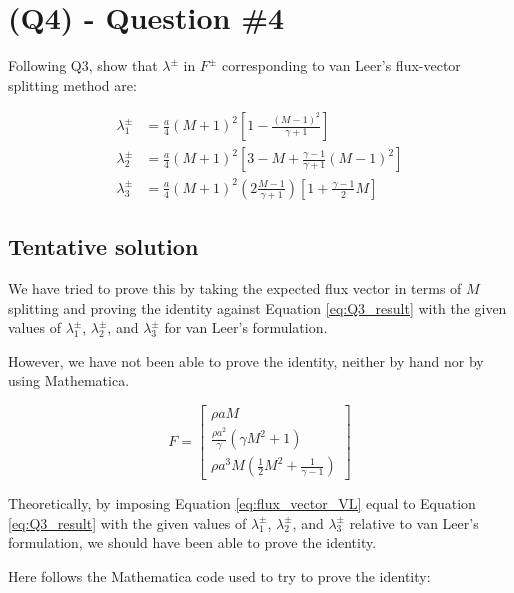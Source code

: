 \section{(Q4) - Question \#4}
\label{sec:Q4}

Following Q3, show that $\lambda^\pm$ in $F^\pm$ corresponding to van Leer's flux-vector splitting method are:

\begin{align}
    \lambda_1^\pm & = \frac{a}{4} (M + 1)^2 \left[1 - \frac{(M - 1)^2}{\gamma + 1}\right]                                   \\
    \lambda_2^\pm & = \frac{a}{4} (M + 1)^2 \left[3 - M + \frac{\gamma - 1}{\gamma + 1} (M - 1)^2\right]                    \\
    \lambda_3^\pm & = \frac{a}{4} (M + 1)^2 \left(2 \frac{M - 1}{\gamma + 1}\right) \left[1 + \frac{\gamma - 1}{2} M\right]
\end{align}


\subsection{Tentative solution}

We have tried to prove this by taking the expected flux vector in terms of $M$ splitting and proving the identity against Equation \ref{eq:Q3_result} with the given values of $\lambda_1^\pm$, $\lambda_2^\pm$, and $\lambda_3^\pm$ for van Leer's formulation.

However, we have not been able to prove the identity, neither by hand nor by using Mathematica.

\begin{equation}
    F = \begin{bmatrix}
        \rho a M                                 \\
        \frac{\rho a^2}{\gamma} (\gamma M^2 + 1) \\
        \rho a^3 M (\frac{1}{2} M^2 + \frac{1}{\gamma-1})
    \end{bmatrix}
    \label{eq:flux_vector_VL}
\end{equation}

Theoretically, by imposing Equation \ref{eq:flux_vector_VL} equal to Equation \ref{eq:Q3_result} with the given values of $\lambda_1^\pm$, $\lambda_2^\pm$, and $\lambda_3^\pm$ relative to van Leer's formulation, we should have been able to prove the identity.

Here follows the Mathematica code used to try to prove the identity:

